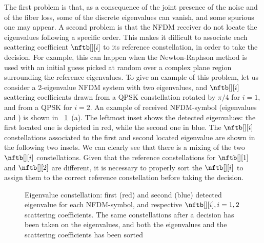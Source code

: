 The first problem is that, as a consequence of the joint presence of the noise
and of the fiber loss, some of the discrete eigenvalues can vanish, and some
spurious one may appear.
A second
problem is that the \ac{NFDM} receiver do not locate the eigenvalues following a
specific order. This makes it difficult to associate each scattering coefficient
$\nftb[][i]$ to its reference constellation, in order to take the
decision. For example, this can happen when the Newton-Raphson method is used with
an initial guess picked at random over a complex plane region surrounding the
reference eigenvalues.
To give an example of this problem, let us consider a 2-eigenvalue \ac{NFDM} system with two eigenvalues, and $\nftb[][i]$ scattering coefficients drawn from a \ac{QPSK} constellation
rotated by $\pi/4$ for $i=1$, and from a \ac{QPSK} for $i=2$.
An example of received \ac{NFDM}-symbol (eigenvalues and \scatcoef{})
 is shown in \figurename~\ref{fig:mixed_eigen}~(a). The leftmost inset shows the detected eigenvalues: the first located one
is depicted in red, while the second one in blue. The $\nftb[][i]$  constellations associated to the first and second located
eigenvalue are shown in the following two insets. We can clearly see that there is a mixing of the two $\nftb[][i]$ constellations. Given that the
reference constellations for $\nftb[][1]$ and $\nftb[][2]$ are different, it is
necessary to properly sort the $\nftb[][i]$ to assign them to the correct
reference constellation before taking the decision.

\begin{figure}[t]
  \centering



  \caption{ Eigenvalue constellation: first (red) and second (blue) detected eigenvalue for each \ac{NFDM}-symbol, and respective $\nftb[][i], i=1,2$ scattering coefficients.  The same constellations after a decision has been taken on the eigenvalues, and both the eigenvalues and the scattering coefficients has been sorted}
  \label{fig:mixed_eigen}
\end{figure}

